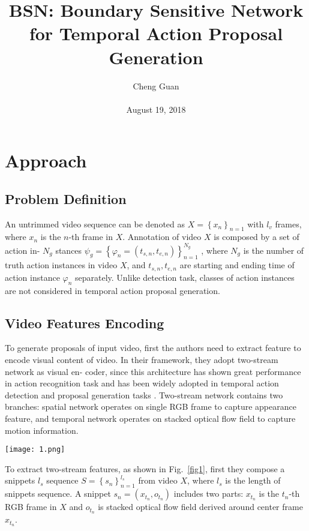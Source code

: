 \documentclass[10pt,twocolumn,letterpaper]{article}
\title{BSN: Boundary Sensitive Network for Temporal Action
	Proposal Generation}
\author{Cheng Guan\\\\
August 19, 2018}
\begin{document}
\maketitle
\section{Approach}
\subsection{Problem Definition}
An untrimmed video sequence can be denoted as $X = {\left\lbrace x_n\right\rbrace}_{n=1} $
with $l_v$ frames, where
$x_n$ is the $n$-th frame in $X$. Annotation of video $X$ is composed by a set of action in-
$N_g$
stances $\psi_g = {\left\lbrace \varphi_n = \left(t_{s,n},t_{e,n}\right)\right\rbrace}_{n=1}^{N_g}$
, where $N_g$ is the number of truth action instances
in video $X$, and $t_{s,n},t_{e,n}$ are starting and ending time of action instance $\varphi_n$  separately.
Unlike detection task, classes of action instances are not considered in temporal action proposal generation.
\subsection{Video Features Encoding}
To generate proposals of input video, first the authors need to extract feature to encode visual
content of video. In their framework, they adopt two-stream network \cite{simonyan2014two} as visual en-
coder, since this architecture has shown great performance in action recognition task
\cite{wang2016temporal} and has been widely adopted in temporal action detection and proposal generation
tasks \cite{zhao2017temporal,gao2017cascaded}. Two-stream network contains two branches: spatial network operates
on single RGB frame to capture appearance feature, and temporal network operates on
stacked optical flow field to capture motion information.
\par
\begin{figure*}[b]
	\centering
	\texttt{[image: 1.png]}
	\caption{Details of proposal generation module. First, to generate
		candidate boundary locations, the authors choose temporal locations with high boundary prob-
		ability or being a probability peak. Then, they combine candidate starting and ending
		locations as proposals when their duration satisfying condition. Construct BSP feature. Given a proposal and actionness probabilities sequence, they can sample actionness
		sequence in starting, center and ending regions of proposal to construct BSP feature.}
	\label{fig1}
\end{figure*}
To extract two-stream features, as shown in Fig.~\ref{fig1}, first they compose a snippets
$l_s$
sequence $S = {\left\lbrace s_n \right\rbrace}_{n=1}^{l_s} $
from video $X$, where $l_s$ is the length of snippets sequence. A
snippet $s_n=\left(x_{t_n},o_{t_n}\right)$ includes two parts: $x_{t_n}$ is the $t_n$-th RGB frame in $X$ and $o_{t_n}$ is
stacked optical flow field derived around center frame $x_{t_n}$.
\end{document}
